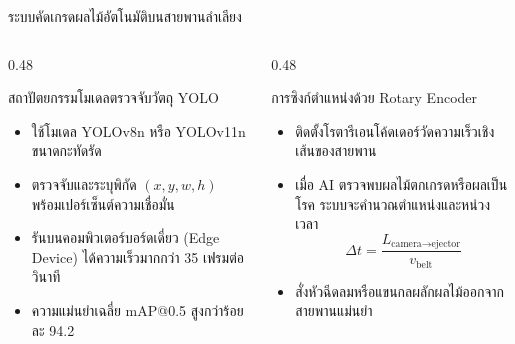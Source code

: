 \documentclass[aspectratio=169, 10pt]{beamer}
\begin{document}
\begin{frame}{ระบบคัดเกรดผลไม้อัตโนมัติบนสายพานลำเลียง}
\begin{columns}[T]
    \begin{column}{0.48\textwidth}
        \begin{mastercard}{สถาปัตยกรรมโมเดลตรวจจับวัตถุ YOLO}
            \begin{itemize}
                \item ใช้โมเดล YOLOv8n หรือ YOLOv11n ขนาดกะทัดรัด
                \item ตรวจจับและระบุพิกัด $(x, y, w, h)$ พร้อมเปอร์เซ็นต์ความเชื่อมั่น
                \item รันบนคอมพิวเตอร์บอร์ดเดี่ยว (Edge Device) ได้ความเร็วมากกว่า 35 เฟรมต่อวินาที
                \item ความแม่นยำเฉลี่ย mAP@0.5 สูงกว่าร้อยละ 94.2
            \end{itemize}
        \end{mastercard}
    \end{column}
    \begin{column}{0.48\textwidth}
        \begin{goldcard}{การซิงก์ตำแหน่งด้วย Rotary Encoder}
            \begin{itemize}
                \item ติดตั้งโรตารีเอนโค้ดเดอร์วัดความเร็วเชิงเส้นของสายพาน
                \item เมื่อ AI ตรวจพบผลไม้ตกเกรดหรือผลเป็นโรค ระบบจะคำนวณตำแหน่งและหน่วงเวลา
                \begin{equation*}
                    \Delta t = \frac{L_{\text{camera}\to\text{ejector}}}{v_{\text{belt}}}
                \end{equation*}
                \item สั่งหัวฉีดลมหรือแขนกลผลักผลไม้ออกจากสายพานแม่นยำ
            \end{itemize}
        \end{goldcard}
    \end{column}
\end{columns}
\end{frame}
\end{document}
